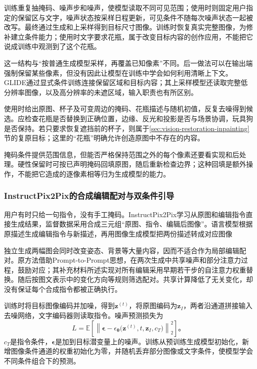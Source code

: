 训练重复抽掩码、噪声步和噪声，使模型读取不同可见范围；使用时则固定用户指定的保留区与文字，噪声状态按采样日程更新，可见条件不随每次噪声状态一起被改写。最终通过生成和上采样得到目标尺寸图像。训练时恢复真实完整图像，为修补建立条件能力；使用时文字要求花瓶，属于改变目标内容的创作应用，不能把它说成训练中观测到了这个花瓶。

这一结构与“按普通生成模型采样，再覆盖已知像素”不同。后一做法可以在输出端强制保留某些像素，但没有因此让模型在训练中学会如何利用清晰上下文。GLIDE通过显式条件训练连接保留区域和目标内容；其上采样模型还读取完整低分辨率图像，以及高分辨率的未遮区域，输入职责也有所区别。

使用时给出原图、杯子及可变周边的掩码、花瓶描述与随机初值，反复去噪得到候选。应检查花瓶是否替换到正确位置，边缘、反光和投影是否与场景协调，玩具狗是否保持。若只要求恢复遮挡前的杯子，则属于\ref{sec:vision-restoration-inpainting}节的复原目标；这里的“花瓶”明确允许创造原图中不存在的内容。

掩码条件提供范围信息，但能否严格保持范围之外的每个像素还要看实现和后处理。硬性保留时可按已声明掩码回填原图，随后重新检查边界；这种回填是额外操作，不能把它造成的逐像素相等归为生成模型的能力。

\Needspace{60mm}
\subsubsection{InstructPix2Pix的合成编辑配对与双条件引导}
\label{sec:vision-generation-instruct-pix2pix}

用户有时只给一句指令，没有手工掩码。InstructPix2Pix学习从原图和编辑指令直接生成结果，监督数据采用合成三元组“原图、指令、编辑后图像”。语言模型根据原描述生成编辑指令与新描述，再用图像生成模型把两份描述转成对应图像

独立生成两幅图会同时改变姿态、背景等大量内容，因而不适合作为局部编辑配对。原方法借助Prompt-to-Prompt思想，在两次生成中共享噪声和部分注意力过程，鼓励对应；其补充材料所述实现对所有编辑采用早期若干步的自注意力权重替换。随后按图文表示中的变化方向等规则筛选配对。共享计算降低了无关变化，却没有保证每个合成指令都被正确执行。

训练时将目标图像编码并加噪，得到$\bm{z}^{(t)}$，将原图编码为$\bm{z}_{I}$，两者沿通道拼接输入去噪网络，文字编码器则读取指令。噪声预测损失为
\begin{equation}
 L=\mathbb{E}\!\left[
 \left\lVert\bm{\epsilon}-
 \epsilon_{\bm{\theta}}
   \bigl(\bm{z}^{(t)},t,\bm{z}_I,c_T\bigr)
 \right\rVert_2^2\right]\text{。}
 \label{eq:vision-instruct-training}
\end{equation}
$c_T$是指令条件，$\bm{\epsilon}$是加到目标潜变量上的噪声。训练从预训练生成模型初始化，新增图像条件通道的权重初始化为零，并随机丢弃部分图像或文字条件，使模型学会不同条件组合下的预测。

